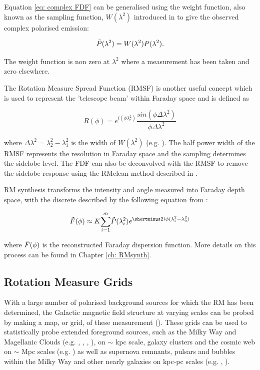 Equation \ref{eq: complex FDF} can be generalised using the weight function, also known as the sampling function, $W(\lambda^2)$ introduced in \cite{Brentjens_2005} to give the observed complex polarised emission:


\begin{equation}
    \Tilde{P}(\lambda^2) = W(\lambda^2)P(\lambda^2).
\end{equation}

The weight function is non zero at $\lambda^2$ where a measurement has been taken and zero elsewhere.

The Rotation Measure Spread Function (RMSF) is another useful concept which is used to represent the 'telescope beam' within Faraday space and is defined as

\begin{equation}
    R(\phi) = e^{i(\phi\lambda_c^2)}\frac{sin(\phi\Delta\lambda^2)}{\phi\Delta\lambda^2}
    \label{eq: RMSF}
\end{equation}


where $\Delta\lambda^2 = \lambda_2^2-\lambda_1^2$ is the width of $W(\lambda^2)$ (e.g. \cite{Dickey_2019}). The half power width of the RMSF represents the resolution in Faraday space and the sampling determines the sidelobe level. The FDF can also be deconvolved with the RMSF to remove the sidelobe response using the RMclean method described in \cite{Heald_2009}.

RM synthesis transforms the intensity and angle measured into Faraday depth space, with the discrete described by the following equation from \cite{Brentjens_2005}:

\begin{equation}
    \Tilde{F}(\phi) \approx K \overset{m}{\underset{i=1}{\sum}}\Tilde{P}(\lambda_i^2)e^{\shortminus2i\phi(\lambda_i^2-\lambda_0^2)}    \label{eq: discrete rm synth}
\end{equation}

where $\Tilde{F}(\phi)$ is the reconstructed Faraday dispersion function. More details on this process can be found in Chapter \ref{ch: RMsynth}.

\subsection{Rotation Measure Grids}

With a large number of polarised background sources for which the RM has been determined, the Galactic magnetic field structure at varying scales can be probed by making a map, or grid, of these measurement (\cite{Johnston_2015}). These grids can be used to statistically probe extended foreground sources, such as the Milky Way and Magellanic Clouds (e.g. \cite{Brown_2003}, \cite{1997A&A...322...98H}, \cite{1980ApJ...242...74S}, \cite{Haverkorn_2006}), on $\sim$ kpc scale, galaxy clusters and the cosmic web on $\sim$ Mpc scales (e.g. \cite{Akahori_2014}) as well as supernova remnants, pulsars and bubbles within the Milky Way and other nearly galaxies on kpc-pc scales (e.g. \cite{1984ApJ...287..295M}, \cite{Gaensler_2001}). 

